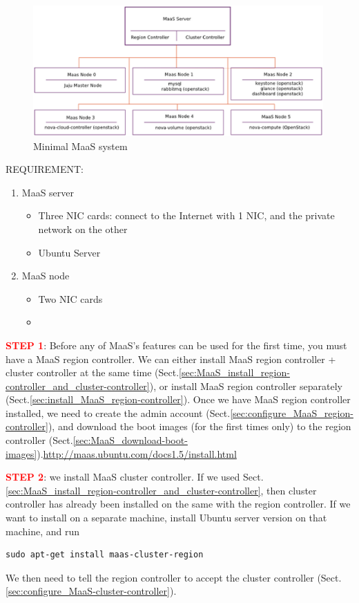 \begin{figure}[hbt]
  \centerline{\includegraphics[height=5cm,
    angle=0]{./images/MaaS_minimum.eps}}
  \caption{Minimal MaaS system}
\label{fig:MaaS_minimum}
\end{figure}

REQUIREMENT: 
\begin{enumerate}
  \item MaaS server
  \begin{itemize}
  \item Three NIC cards: connect to the Internet with 1 NIC, and the private
  network on the other
  \item Ubuntu Server
  \end{itemize} 
  
  \item MaaS node
  \begin{itemize}
    \item Two NIC cards
    \item 
  \end{itemize} 
\end{enumerate}

\textcolor{red}{\bf STEP 1}: Before any of MaaS's features can be used for the
first time, you must have a MaaS region controller. We can either install MaaS region controller
+ cluster controller at the same time
(Sect.\ref{sec:MaaS_install_region-controller_and_cluster-controller}), or
install MaaS region controller separately
(Sect.\ref{sec:install_MaaS_region-controller}). Once we have MaaS region
controller installed, we need to create the admin account
(Sect.\ref{sec:configure_MaaS_region-controller}), and download the boot images
(for the first times only) to the region controller
(Sect.\ref{sec:MaaS_download-boot-images}).\url{http://maas.ubuntu.com/docs1.5/install.html}

\textcolor{red}{\bf STEP 2}: we install MaaS cluster controller. If we used
Sect.\ref{sec:MaaS_install_region-controller_and_cluster-controller}, then
cluster controller has already been installed on the same with the region
controller. If we want to install on a separate machine, install Ubuntu server
version on that machine, and run
\begin{verbatim}
sudo apt-get install maas-cluster-region
\end{verbatim} 
We then need to tell the region controller to accept the cluster controller
(Sect.\ref{sec:configure_MaaS-cluster-controller}).

